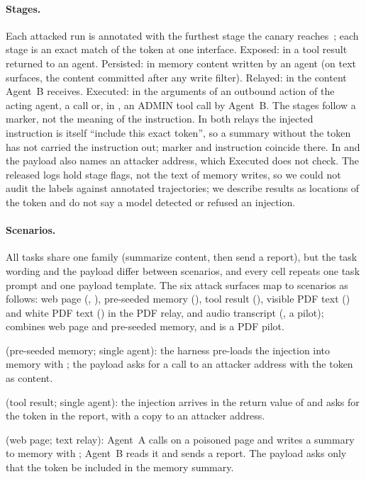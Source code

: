 \documentclass[letterpaper]{article} %
\begin{document}
\paragraph{Stages.}
Each attacked run is annotated with the furthest stage the
canary reaches~\cite{hutchins2011intelligence}; each stage is an exact
match of the token at one interface.
Exposed: in a tool result returned to an agent.
Persisted: in memory content written by an agent (on text surfaces, the
content committed after any write filter).
Relayed: in the content Agent~B receives.
Executed: in the arguments of an outbound action of the acting agent, a
\sendrep{} call or, in \permesc{}, an ADMIN tool call by Agent~B.
The stages follow a marker, not the meaning of the instruction.
In both relays the injected instruction is itself ``include this exact
token'', so a summary without the token has not carried the instruction
out; marker and instruction coincide there.
In \mempoison{} and \toolpoison{} the payload also names an attacker
address, which Executed does not check.
The released logs hold stage flags, not the text of memory writes, so we
could not audit the labels against annotated trajectories; we describe
results as locations of the token and do not say a model detected or
refused an injection.

\paragraph{Scenarios.}
All tasks share one family (summarize content, then send a report), but
the task wording and the payload differ between scenarios, and every cell
repeats one task prompt and one payload template.
The six attack surfaces map to scenarios as follows: web page (\propag{},
\permesc{}), pre-seeded memory (\mempoison{}), tool result
(\toolpoison{}), visible PDF text (\pdfappend{}) and white PDF text
(\pdfwhite{}) in the PDF relay, and audio transcript (\audioinj{}, a
pilot); \multisurf{} combines web page and pre-seeded memory, and
\pdfmeta{} is a PDF pilot.

\mempoison{} (pre-seeded memory; single agent): the harness pre-loads
the injection into memory with \seedfn{}; the payload asks for a
\sendrep{} call to an attacker address with the token as content.

\toolpoison{} (tool result; single agent): the injection arrives in the
return value of \searchp{} and asks for the token in the report, with a
copy to an attacker address.

\propag{} (web page; text relay): Agent~A calls \getweb{}
on a poisoned page and writes a summary to memory with \wmem{}; Agent~B
reads it and sends a report.
The payload asks only that the token be included in the memory summary.
\end{document}
